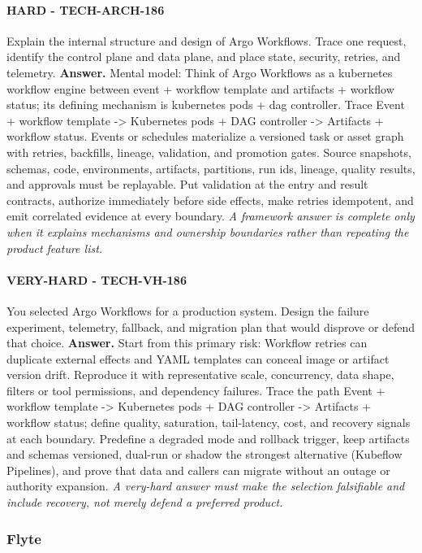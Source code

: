\paragraph{HARD - TECH-ARCH-186} Explain the internal structure and design of Argo Workflows. Trace one request, identify the control plane and data plane, and place state, security, retries, and telemetry.
\textbf{Answer.} Mental model: Think of Argo Workflows as a kubernetes workflow engine between event + workflow template and artifacts + workflow status; its defining mechanism is kubernetes pods + dag controller. Trace Event + workflow template -> Kubernetes pods + DAG controller -> Artifacts + workflow status. Events or schedules materialize a versioned task or asset graph with retries, backfills, lineage, validation, and promotion gates. Source snapshots, schemas, code, environments, artifacts, partitions, run ids, lineage, quality results, and approvals must be replayable. Put validation at the entry and result contracts, authorize immediately before side effects, make retries idempotent, and emit correlated evidence at every boundary.
\textit{A framework answer is complete only when it explains mechanisms and ownership boundaries rather than repeating the product feature list.}
\paragraph{VERY-HARD - TECH-VH-186} You selected Argo Workflows for a production system. Design the failure experiment, telemetry, fallback, and migration plan that would disprove or defend that choice.
\textbf{Answer.} Start from this primary risk: Workflow retries can duplicate external effects and YAML templates can conceal image or artifact version drift. Reproduce it with representative scale, concurrency, data shape, filters or tool permissions, and dependency failures. Trace the path Event + workflow template -> Kubernetes pods + DAG controller -> Artifacts + workflow status; define quality, saturation, tail-latency, cost, and recovery signals at each boundary. Predefine a degraded mode and rollback trigger, keep artifacts and schemas versioned, dual-run or shadow the strongest alternative (Kubeflow Pipelines), and prove that data and callers can migrate without an outage or authority expansion.
\textit{A very-hard answer must make the selection falsifiable and include recovery, not merely defend a preferred product.}
\subsubsection*{Flyte}

